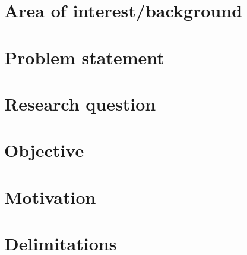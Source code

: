 \section{Area of interest/background}

\section{Problem statement}

\section{Research question}

\section{Objective}

\section{Motivation}

\section{Delimitations}
